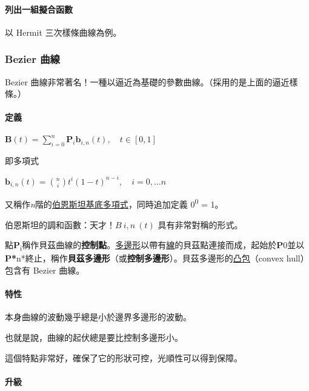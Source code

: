 \documentclass[
]{article}
\begin{document}
\hypertarget{header-n17}{%
\paragraph{列出一組擬合函數}\label{header-n17}}

以 Hermit 三次樣條曲線為例。

\hypertarget{header-n19}{%
\subsubsection{Bezier 曲線}\label{header-n19}}

Bezier
曲線非常著名！一種以逼近為基礎的參數曲線。（採用的是上面的逼近樣條。）

\hypertarget{header-n21}{%
\paragraph{定義}\label{header-n21}}

\({\mathbf  {B}}(t)=\sum _{{i=0}}^{n}{\mathbf  {P}}_{i}{\mathbf  {b}}_{{i,n}}(t),\quad t\in [0,1]\)

即多項式

\({\mathbf  {b}}_{{i,n}}(t)={n \choose i}t^{i}(1-t)^{{n-i}},\quad i=0,\ldots n\)

又稱作\emph{n}階的\href{https://zh.wikipedia.org/w/index.php?title=伯恩斯坦多項式\&action=edit\&redlink=1}{伯恩斯坦基底多項式}，同時追加定義
0\textsuperscript{0} = 1。

伯恩斯坦的調和函數：天才！\(B~i, n~(t)\) 具有非常對稱的形式。

點\textbf{P}\textsubscript{i}稱作貝茲曲線的\textbf{控制點}。\href{https://zh.wikipedia.org/wiki/多邊形}{多邊形}以帶有\href{https://zh.wikipedia.org/wiki/線}{線}的貝茲點連接而成，起始於\textbf{P}0並以\textbf{P*}n*終止，稱作\textbf{貝茲多邊形}（或\textbf{控制多邊形}）。貝茲多邊形的\href{https://zh.wikipedia.org/wiki/凸包}{凸包}（convex
hull）包含有 Bezier 曲線。

\hypertarget{header-n28}{%
\paragraph{特性}\label{header-n28}}

本身曲線的波動幾乎總是小於邊界多邊形的波動。

也就是說，曲線的起伏總是要比控制多邊形小。

這個特點非常好，確保了它的形狀可控，光順性可以得到保障。

\hypertarget{header-n32}{%
\paragraph{升級}\label{header-n32}}
\end{document}
